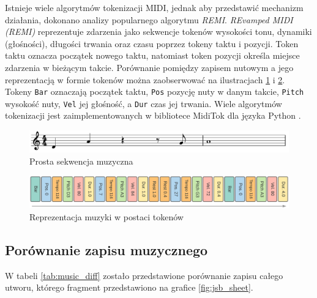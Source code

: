 \documentclass[data-science]{agh-wi} %
\begin{document}
Istnieje wiele algorytmów tokenizacji MIDI, jednak aby przedstawić mechanizm działania, dokonano analizy popularnego algorytmu \textit{REMI}. \textit{REvamped MIDI (REMI)} reprezentuje zdarzenia jako sekwencje tokenów wysokości tonu, dynamiki (głośności), długości trwania oraz czasu poprzez tokeny taktu i pozycji. Token taktu oznacza początek nowego taktu, natomiast token pozycji określa miejsce zdarzenia w bieżącym takcie. Porównanie pomiędzy zapisem nutowym a jego reprezentacją w formie tokenów można zaobserwować na ilustracjach \ref*{fig:remi_notes} i \ref*{fig:remi_tokens}. Tokeny \texttt{Bar} oznaczają początek taktu, \texttt{Pos} pozycję nuty w danym takcie, \texttt{Pitch} wysokość nuty, \texttt{Vel} jej głośność, a \texttt{Dur} czas jej trwania. Wiele algorytmów tokenizacji jest zaimplementowanych w bibliotece MidiTok dla języka Python \cite{miditok2021}.

\begin{figure}[ht!]
    \begin{center}
        \includegraphics[width=0.9\linewidth]{./img/tokenizer_notes.pdf}
    \end{center}
    \caption{Prosta sekwencja muzyczna}\label{fig:remi_notes}
\end{figure}

\begin{figure}[ht!]
    \begin{center}
        \includegraphics[width=0.9\linewidth]{./img/remi.png}
    \end{center}
    \caption{Reprezentacja muzyki w postaci tokenów}\label{fig:remi_tokens}
\end{figure}

\subsection{Porównanie zapisu muzycznego}
W tabeli \ref*{tab:music_diff} zostało przedstawione porównanie zapisu całego utworu, którego fragment przedstawiono na grafice \ref*{fig:jsb_sheet}.
\end{document}
